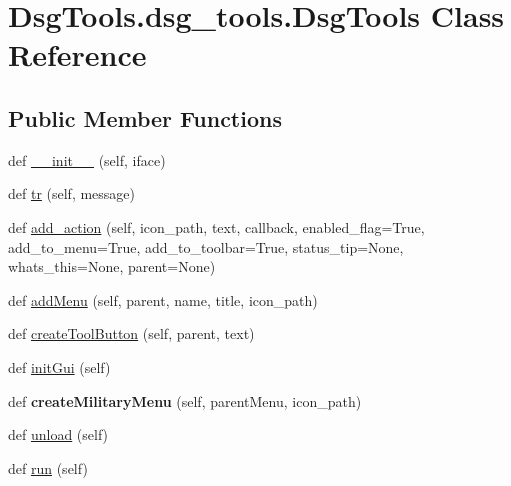 \hypertarget{class_dsg_tools_1_1dsg__tools_1_1_dsg_tools}{}\section{Dsg\+Tools.\+dsg\+\_\+tools.\+Dsg\+Tools Class Reference}
\label{class_dsg_tools_1_1dsg__tools_1_1_dsg_tools}
\subsection*{Public Member Functions}
\begin{DoxyCompactItemize}
\item 
def \mbox{\hyperlink{class_dsg_tools_1_1dsg__tools_1_1_dsg_tools_af233064bb2aff6407b3824c4be61ef37}{\+\_\+\+\_\+init\+\_\+\+\_\+}} (self, iface)
\item 
def \mbox{\hyperlink{class_dsg_tools_1_1dsg__tools_1_1_dsg_tools_aeeb684b5ae66c23eb45ccffefb6c0485}{tr}} (self, message)
\item 
def \mbox{\hyperlink{class_dsg_tools_1_1dsg__tools_1_1_dsg_tools_a15c3df2c1c8baf94cd08d32ca310e557}{add\+\_\+action}} (self, icon\+\_\+path, text, callback, enabled\+\_\+flag=True, add\+\_\+to\+\_\+menu=True, add\+\_\+to\+\_\+toolbar=True, status\+\_\+tip=None, whats\+\_\+this=None, parent=None)
\item 
def \mbox{\hyperlink{class_dsg_tools_1_1dsg__tools_1_1_dsg_tools_a341a80ad74714899d12af02121495604}{add\+Menu}} (self, parent, name, title, icon\+\_\+path)
\item 
def \mbox{\hyperlink{class_dsg_tools_1_1dsg__tools_1_1_dsg_tools_a7f1c3ecc3fab9165222ccad53bc61c01}{create\+Tool\+Button}} (self, parent, text)
\item 
def \mbox{\hyperlink{class_dsg_tools_1_1dsg__tools_1_1_dsg_tools_ad85466220ae044da1b255a54b0943b59}{init\+Gui}} (self)
\item 
\mbox{\label{class_dsg_tools_1_1dsg__tools_1_1_dsg_tools_a229dad2ecb0ba56fc2bfda6f7d5757ef}} 
def {\bfseries create\+Military\+Menu} (self, parent\+Menu, icon\+\_\+path)
\item 
def \mbox{\hyperlink{class_dsg_tools_1_1dsg__tools_1_1_dsg_tools_ab52994b7701cff5d702a220e3a552f08}{unload}} (self)
\item 
def \mbox{\hyperlink{class_dsg_tools_1_1dsg__tools_1_1_dsg_tools_af701b6c2bc2031bcfd34083e45b8f6ac}{run}} (self)
\item 

\end{DoxyCompactItemize}
